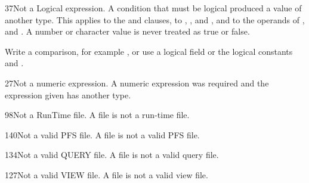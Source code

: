 \begin{XbaseMessageEntry}{37}{Not a Logical expression.}
A condition that must be logical produced a value of another type. This applies to the  and  clauses, to , ,  and , and to the operands of ,  and . A number or character value is never treated as true or false.

Write a comparison, for example , or use a logical field or the logical constants  and .
\end{XbaseMessageEntry}

\begin{XbaseMessageEntry}{27}{Not a numeric expression.}
A numeric expression was required and the expression given has another type.
\end{XbaseMessageEntry}

\begin{XbaseMessageEntry}{98}{Not a RunTime file.}
A file is not a run-time file.
\end{XbaseMessageEntry}

\begin{XbaseMessageEntry}{140}{Not a valid PFS file.}
A file is not a valid PFS file.
\end{XbaseMessageEntry}

\begin{XbaseMessageEntry}{134}{Not a valid QUERY file.}
A file is not a valid query file.
\end{XbaseMessageEntry}

\begin{XbaseMessageEntry}{127}{Not a valid VIEW file.}
A file is not a valid view file.
\end{XbaseMessageEntry}

